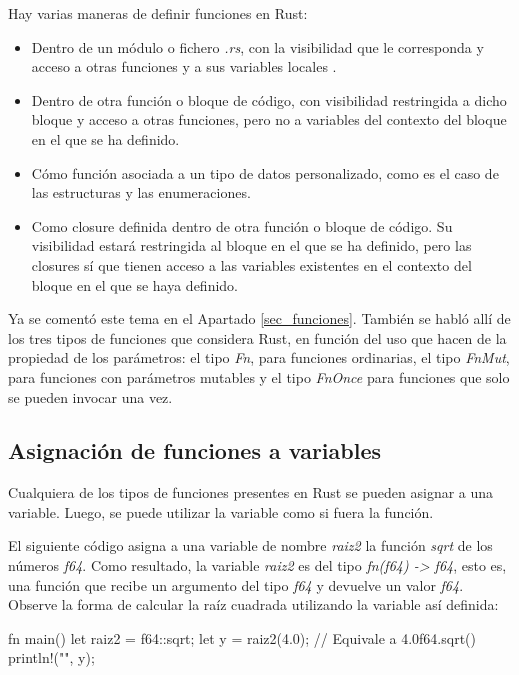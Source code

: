 Hay varias maneras de definir funciones en Rust:

\begin{itemize}
   \item Dentro de un módulo o fichero \textit{.rs}, con la visibilidad que le corresponda y acceso a otras funciones y a sus variables locales .
   \item Dentro de otra función o bloque de código, con visibilidad restringida a dicho bloque y acceso a otras funciones, pero no a variables del contexto del bloque en el que se ha definido.
   \item Cómo función asociada a un tipo de datos personalizado, como es el caso de las estructuras y las enumeraciones.
   \item Como closure definida dentro de otra función o bloque de código. Su visibilidad estará restringida al bloque en el que se ha definido, pero las closures sí que tienen acceso a las variables existentes en el contexto del bloque en el que se haya definido. 
\end{itemize}

Ya se comentó este tema en el Apartado \ref{sec_funciones}. También se habló allí de los tres tipos de funciones que considera Rust, en función del uso que hacen de la propiedad de los parámetros: el tipo \textit{Fn}, para funciones ordinarias, el tipo \textit{FnMut}, para funciones con parámetros mutables y el tipo \textit{FnOnce} para funciones que solo se pueden invocar una vez.

\subsection{Asignación de funciones a variables}
\noindent Cualquiera de los tipos de funciones presentes en Rust se pueden asignar a una variable. Luego, se puede utilizar la variable como si fuera la función. 

El siguiente código asigna a una variable de nombre \textit{raiz2} la función \textit{sqrt} de los números \textit{f64}. Como resultado, la variable \textit{raiz2} es del tipo \textit{fn(f64) -> f64}, esto es, una función que recibe un argumento del tipo \textit{f64} y devuelve un valor \textit{f64}. Observe la forma de calcular la raíz cuadrada utilizando la variable así definida:

\vspace{0.7em}
\begin{Codigo}
   fn main() {
      let raiz2  = f64::sqrt;
      let y = raiz2(4.0); // Equivale a 4.0f64.sqrt()
      println!("{}", y);
   }
\end{Codigo}

